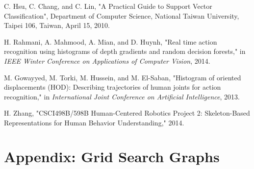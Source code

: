 \documentclass[11pt,nocopyrightspace]{config}
\begin{document}




\begin{thebibliography}
\softraggedright

C. Hsu, C. Chang, and C. Lin, "A Practical Guide to Support Vector Classification", Department of Computer Science, National Taiwan University, Taipei 106, Taiwan, April 15, 2010.

H. Rahmani, A. Mahmood, A. Mian, and D. Huynh, "Real time action recognition using histograms of depth gradients and random decision forests," in \textit{IEEE Winter Conference on Applications of Computer Vision}, 2014.

M. Gowayyed, M. Torki, M. Hussein, and M. El-Saban, "Histogram of oriented displacements (HOD): Describing trajectories of human joints for action recognition," in \textit{International Joint Conference on Artificial Intelligence}, 2013.

H. Zhang, "CSCI498B/598B Human-Centered Robotics Project 2: Skeleton-Based Representations for Human Behavior Understanding," 2014.

\end{thebibliography}

\appendix
\section{Appendix: Grid Search Graphs}
\end{document}
